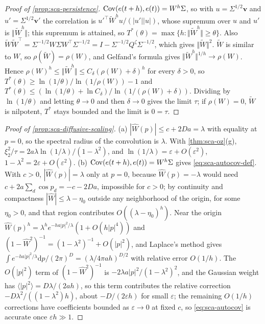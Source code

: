 \begin{proof}[Proof of \cref{prop:sca-persistence}]
$\operatorname{Cov}(e(t+h),e(t))=W^h\Sigma$, so with $u=\Sigma^{1/2}\mathbf v$ and $u'=\Sigma^{1/2}\mathbf v'$ the correlation is $u'^\top\tilde W^hu/(|u'||u|)$, whose supremum over $u$ and $u'$ is $\Vert\tilde W^h\Vert$; this supremum is attained, so $T^\ast(\theta)=\max\{h:\Vert\tilde W^h\Vert\ge\theta\}$. Also $\tilde W\tilde W^\top=\Sigma^{-1/2}W\Sigma W^\top\Sigma^{-1/2}=I-\Sigma^{-1/2}Q^\zeta\Sigma^{-1/2}$, which gives $\Vert\tilde W\Vert^2$. $\tilde W$ is similar to $W$, so $\rho(\tilde W)=\rho(W)$, and Gelfand's formula gives $\Vert\tilde W^h\Vert^{1/h}\to\rho(W)$. Hence $\rho(W)^h\le\Vert\tilde W^h\Vert\le C_\delta(\rho(W)+\delta)^h$ for every $\delta>0$, so $T^\ast(\theta)\ge\ln(1/\theta)/\ln(1/\rho(W))-1$ and $T^\ast(\theta)\le(\ln(1/\theta)+\ln C_\delta)/\ln(1/(\rho(W)+\delta))$. Dividing by $\ln(1/\theta)$ and letting $\theta\to0$ and then $\delta\to0$ gives the limit $\tau$; if $\rho(W)=0$, $\tilde W$ is nilpotent, $T^\ast$ stays bounded and the limit is $0=\tau$.
\end{proof}

\begin{proof}[Proof of \cref{prop:sca-diffusive-scaling}]
(a) $|\hat W(p)|\le c+2Da=\lambda$ with equality at $p=0$, so the spectral radius of the convolution is $\lambda$. With \cref{thm:sca-oz}(g), $\xi_2^2/\tau=2a\lambda\ln(1/\lambda)/(1-\lambda^2)$, and $\ln(1/\lambda)=\varepsilon+O(\varepsilon^2)$, $1-\lambda^2=2\varepsilon+O(\varepsilon^2)$. (b) $\operatorname{Cov}(e(t+h),e(t))=W^h\Sigma$ gives \eqref{eq:sca-autocov-def}. With $c>0$, $|\hat W(p)|=\lambda$ only at $p=0$, because $\hat W(p)=-\lambda$ would need $c+2a\sum_d\cos p_d=-c-2Da$, impossible for $c>0$; by continuity and compactness $|\hat W|\le\lambda-\eta_0$ outside any neighborhood of the origin, for some $\eta_0>0$, and that region contributes $O((\lambda-\eta_0)^h)$. Near the origin $\hat W(p)^h=\lambda^he^{-ha|p|^2/\lambda}(1+O(h|p|^4))$ and $(1-\hat W^2)^{-1}=(1-\lambda^2)^{-1}+O(|p|^2)$, and Laplace's method gives $\int e^{-ha|p|^2/\lambda}\mathrm{d}p/(2\pi)^D=(\lambda/4\pi ah)^{D/2}$ with relative error $O(1/h)$. The $O(|p|^2)$ term of $(1-\hat W^2)^{-1}$ is $-2\lambda a|p|^2/(1-\lambda^2)^2$, and the Gaussian weight has $\langle|p|^2\rangle=D\lambda/(2ah)$, so this term contributes the relative correction $-D\lambda^2/((1-\lambda^2)h)$, about $-D/(2\varepsilon h)$ for small $\varepsilon$; the remaining $O(1/h)$ corrections have coefficients bounded as $\varepsilon\to0$ at fixed $c$, so \eqref{eq:sca-autocov} is accurate once $\varepsilon h\gg1$.
\end{proof}

